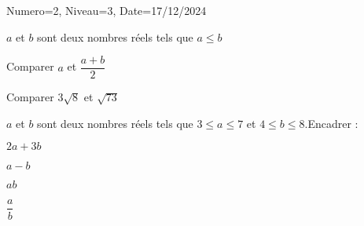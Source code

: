 \documentclass[a4paper,12pt]{article}
\begin{document}
\begin{Maquette}[DS]{Numero=2, Niveau=3, Date=17/12/2024}

\begin{exercice}
$a$ et $b$ sont deux nombres réels tels que $a\leq b$
\begin{enumerate}

\begin{minipage}{.5\linewidth}
\item Comparer $a$ et $\dfrac{a+b}{2}$ 
\end{minipage}%
\begin{minipage}{.5\linewidth}
\item Comparer $3\sqrt{8}$ et $\sqrt{73}$ 
\end{minipage}
\end{enumerate}
\begin{minipage}{.5\linewidth}
\end{minipage}%
\vline
\begin{minipage}{.5\linewidth}
\end{minipage}
\end{exercice}

\begin{exercice}
$a$ et $b$ sont deux nombres réels tels que $3\leq a\leq 7$ et $4\leq b\leq 8$.Encadrer :

\begin{minipage}{.24\linewidth}
$2a+3b$
\end{minipage}
\begin{minipage}{.24\linewidth}
$a-b$
\end{minipage}
\begin{minipage}{.24\linewidth}
$ab$ 
\end{minipage}
\begin{minipage}{.24\linewidth}
$\dfrac{a}{b}$ 
\end{minipage}%

\begin{minipage}{0.24\linewidth}
\end{minipage}
\vline
\begin{minipage}{0.24\linewidth}
\end{minipage}
\vline
\begin{minipage}{0.24\linewidth}
\end{minipage}
\vline
\begin{minipage}{0.24\linewidth}
\end{minipage}
\end{exercice}


\end{Maquette}
\end{document}
